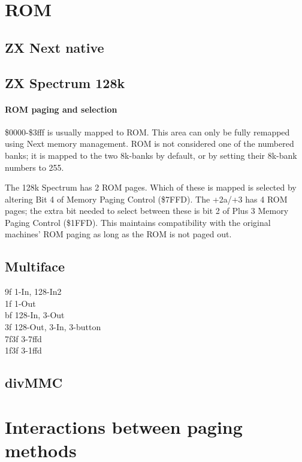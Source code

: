 \section{ROM}

\subsection{ZX Next native}

\subsection{ZX Spectrum 128k}

\paragraph{ROM paging and selection}

\$0000-\$3fff is usually mapped to ROM. This area can only be fully
remapped using Next memory management. ROM is not considered one of
the numbered banks; it is mapped to the two 8k-banks by default, or by
setting their 8k-bank numbers to 255.

The 128k Spectrum has 2 ROM pages. Which of these is mapped is
selected by altering Bit 4 of Memory Paging Control (\$7FFD). The
+2a/+3 has 4 ROM pages; the extra bit needed to select between these
is bit 2 of Plus 3 Memory Paging Control (\$1FFD). This maintains
compatibility with the original machines' ROM paging as long as the
ROM is not paged out.





\subsection{Multiface}

9f 1-In, 128-In2\\
1f 1-Out\\
bf 128-In, 3-Out\\
3f 128-Out, 3-In, 3-button\\
7f3f 3-7ffd\\
1f3f 3-1ffd

\subsection{divMMC}



\section{Interactions between paging methods}

